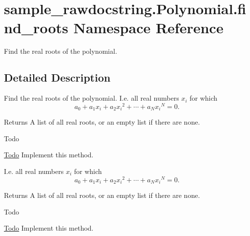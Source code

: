 \hypertarget{namespacesample__rawdocstring_1_1_polynomial_1_1find__roots}{\section{sample\-\_\-rawdocstring.\-Polynomial.\-find\-\_\-roots Namespace Reference}
\label{namespacesample__rawdocstring_1_1_polynomial_1_1find__roots}
}


Find the real roots of the polynomial.  




\subsection{Detailed Description}
Find the real roots of the polynomial. I.\-e. all real numbers $ x_i $ for which \[ a_0 + a_1 x_i + a_2 {x_i}^2 + \cdots + a_N {x_i}^N = 0. \]

\begin{DoxyReturn}{Returns}
A list of all real roots, or an empty list if there are none.
\end{DoxyReturn}
\begin{DoxyRefDesc}{Todo}
\item[\hyperlink{todo__todo000001}{Todo}]Implement this method.\end{DoxyRefDesc}


I.\-e. all real numbers $ x_i $ for which \[ a_0 + a_1 x_i + a_2 {x_i}^2 + \cdots + a_N {x_i}^N = 0. \]

\begin{DoxyReturn}{Returns}
A list of all real roots, or an empty list if there are none.
\end{DoxyReturn}
\begin{DoxyRefDesc}{Todo}
\item[\hyperlink{todo__todo000003}{Todo}]Implement this method.\end{DoxyRefDesc}
